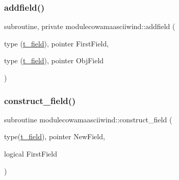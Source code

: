 \subsubsection{\texorpdfstring{addfield()}{addfield()}}
{\footnotesize\ttfamily subroutine, private modulecowamaasciiwind\+::addfield (\begin{DoxyParamCaption}\item[{type (\mbox{\hyperlink{structmodulecowamaasciiwind_1_1t__field}{t\+\_\+field}}), pointer}]{First\+Field,  }\item[{type (\mbox{\hyperlink{structmodulecowamaasciiwind_1_1t__field}{t\+\_\+field}}), pointer}]{Obj\+Field }\end{DoxyParamCaption})\hspace{0.3cm}{\ttfamily [private]}}

\mbox{\label{namespacemodulecowamaasciiwind_a661012c07a9e926668c44de9bfc8e1ae}} 
\subsubsection{\texorpdfstring{construct\+\_\+field()}{construct\_field()}}
{\footnotesize\ttfamily subroutine modulecowamaasciiwind\+::construct\+\_\+field (\begin{DoxyParamCaption}\item[{type(\mbox{\hyperlink{structmodulecowamaasciiwind_1_1t__field}{t\+\_\+field}}), pointer}]{New\+Field,  }\item[{logical}]{First\+Field }\end{DoxyParamCaption})\hspace{0.3cm}{\ttfamily [private]}}

